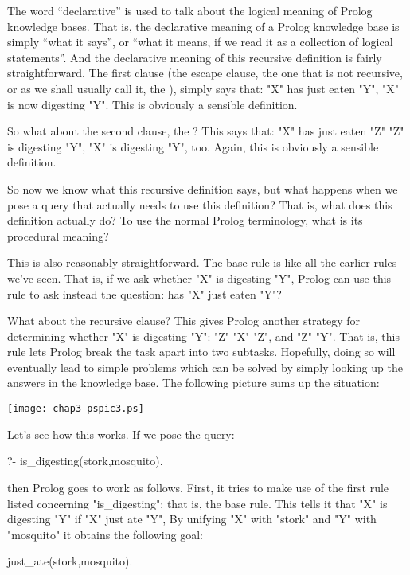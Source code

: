 The word ``declarative'' is used to talk about the logical meaning of
Prolog knowledge bases.  That is, the declarative meaning of a Prolog
knowledge base is simply ``what it says'', or ``what it means, if we read
it as a collection of logical statements''.  And the declarative
meaning of this recursive definition is fairly straightforward.  The
first clause (the escape clause, the one that is not recursive, or
as we shall usually call it, the ), simply says
that:  "X" has just eaten "Y",  "X" is now
digesting "Y".  This is obviously a sensible definition.

So what about the second clause, the ?  This
says that:  "X" has just eaten "Z"
 "Z" is digesting "Y",  "X"
is digesting "Y", too. Again, this is obviously a sensible
definition.

So now we know what this recursive definition says, but what happens
when we pose a query that actually needs to use this definition?  That
is, what does this definition actually do?  To use the normal Prolog
terminology, what is its procedural meaning?

This is also reasonably straightforward.  The base rule is like all
the earlier rules we've seen.  That is, if we ask whether "X" is
digesting "Y", Prolog can use this rule to ask instead
the question: has "X" just eaten "Y"?

What about the recursive clause?  This gives Prolog another strategy
for determining whether "X" is digesting "Y":
 "Z"  "X"
 "Z", and "Z" 
"Y".  That is, this rule lets Prolog break the task
apart into two subtasks.  Hopefully, doing so will eventually lead to
simple problems which can be solved by simply looking up the answers
in the knowledge base. The following picture sums up the situation:

\medskip

\begin{center}
\texttt{[image: chap3-pspic3.ps]}
\end{center}

Let's see how this works. If we pose the query:
\begin{LPNcodedisplay}
?- is_digesting(stork,mosquito).
\end{LPNcodedisplay}
then Prolog goes to work as follows.  First, it tries to make use of
the first rule listed concerning "is\_digesting"; that is, the
base rule.  This tells it that "X" is digesting
"Y" if "X" just ate "Y", By unifying
"X" with "stork" and "Y" with
"mosquito" it obtains the following goal:
\begin{LPNcodedisplay}
just_ate(stork,mosquito).
\end{LPNcodedisplay}


